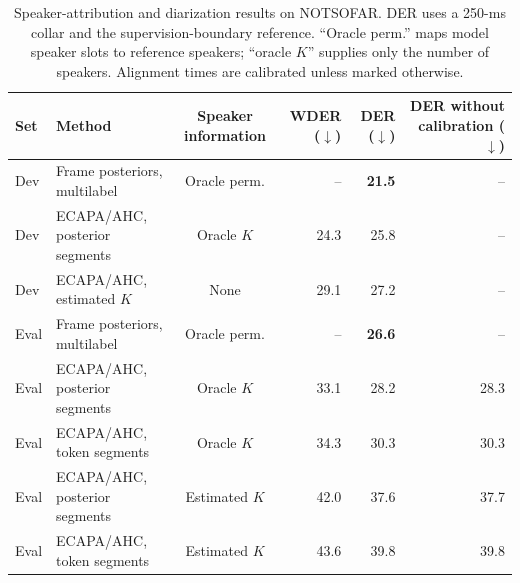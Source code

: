 \begin{table}[t]
  \centering
  \caption{Speaker-attribution and diarization results on NOTSOFAR. DER uses
  a 250-ms collar and the supervision-boundary reference. ``Oracle perm.''
  maps model speaker slots to reference speakers; ``oracle $K$'' supplies only
  the number of speakers. Alignment times are calibrated unless marked
  otherwise.}
  \label{tab:speaker-main}
  \small
  \begin{tabular}{llcrrr}
    \toprule
    Set & Method & Speaker information & WDER ($\downarrow$) & DER ($\downarrow$) &
      \shortstack{DER without\\calibration ($\downarrow$)} \\
    \midrule
    Dev & Frame posteriors, multilabel & Oracle perm. & -- & \textbf{21.5} & -- \\
    Dev & ECAPA/AHC, posterior segments & Oracle $K$ & 24.3 & 25.8 & -- \\
    Dev & ECAPA/AHC, estimated $K$      & None & 29.1 & 27.2 & -- \\
    \midrule
    Eval & Frame posteriors, multilabel & Oracle perm. & -- & \textbf{26.6} & -- \\
    Eval & ECAPA/AHC, posterior segments & Oracle $K$ & 33.1 & 28.2 & 28.3 \\
    Eval & ECAPA/AHC, token segments     & Oracle $K$ & 34.3 & 30.3 & 30.3 \\
    Eval & ECAPA/AHC, posterior segments & Estimated $K$ & 42.0 & 37.6 & 37.7 \\
    Eval & ECAPA/AHC, token segments     & Estimated $K$ & 43.6 & 39.8 & 39.8 \\
    \bottomrule
  \end{tabular}
\end{table}